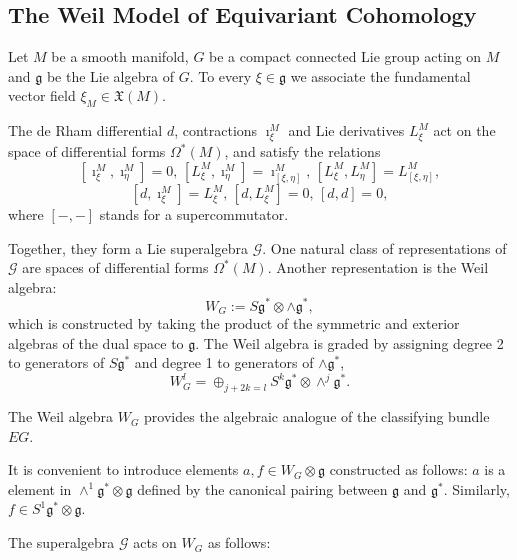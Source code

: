 \documentclass[11pt]{report}
\theoremstyle{plain}
\theoremstyle{definition}
\theoremstyle{remark}
\theoremstyle{remark}
\numberwithin{equation}{section}
\begin{document}
\subsection{The Weil Model of Equivariant Cohomology}


Let $M$ be a smooth  manifold, $G$ be a compact connected Lie group acting on $M$ and $\mathfrak{g}$ be the Lie algebra of $G$. 
To every $\xi \in \mathfrak{g}$ we associate the fundamental vector field $\xi_M \in \mathfrak{X}(M)$.


The de Rham differential $d$, contractions $\imath_\xi^M$ and Lie derivatives $L_\xi^M$ act on the space of differential forms $\Omega^*(M)$, and satisfy the relations
%
$$
[\imath_\xi^M, \imath_\eta^M] =0, \, [L_\xi^M, \imath_\eta^M] = \imath_{[\xi, \eta]}^M, \, [L_\xi^M, L_\eta^M]=L_{[\xi, \eta]}^M,
$$
$$
[d, \imath_{\xi}^M] =L_{\xi}^M, \, [d, L_{\xi}^M]=0, \,  [d,d]=0,
$$
where $[-,-]$ stands for a supercommutator.

Together, they form a Lie superalgebra  $\mathcal{G}$.  One natural class of representations of $\mathcal{G}$ are spaces of differential forms $\Omega^*(M)$. Another representation is the Weil algebra:
%
\begin{equation}
W_G:= S{\mathfrak{g}^*} \otimes \wedge {\mathfrak{g}^*},
\end{equation}
which is constructed by taking the product of the symmetric and exterior algebras of the dual space to $\mathfrak{g}$.
The Weil algebra is graded  by assigning degree 2 to generators of $S\mathfrak{g}^*$ and degree 1 to generators of $\wedge \mathfrak{g}^*$,
%
\begin{equation}
W^l_G = \oplus_{j+2k=l} S^k {\mathfrak{g}^*} \otimes \wedge^j \mathfrak{g}^*.
\end{equation}

The Weil algebra $W_G$ provides the algebraic analogue of the classifying bundle $EG$. 

It is convenient to introduce elements $a, f \in W_G \otimes \mathfrak{g}$ constructed as follows: $a$ is a element in $\wedge^1 \mathfrak{g}^* \otimes \mathfrak{g}$ defined by the canonical pairing between $\mathfrak{g}$ and $\mathfrak{g}^*$. Similarly, $f \in S^1\mathfrak{g}^* \otimes \mathfrak{g}$.

The superalgebra $\mathcal{G}$ acts on $W_G$ as follows:
\end{document}
